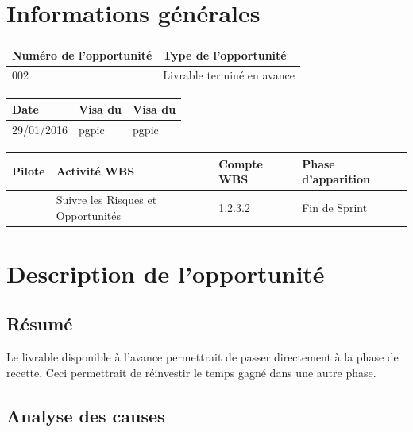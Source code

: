 \section*{Informations générales}
 
\begin{table}[H]
\centering
	\begin{tabularx}{16.8cm}{|X|X|}
	\hline
	\rowcolor{gray!40} Numéro de l'opportunité & Type de l'opportunité \\
	\hline
	 002 & Livrable terminé en avance  \\
	\hline
	\end{tabularx}
\end{table}

\begin{table}[H]
\centering
	\begin{tabularx}{16.8cm}{|X|X|X|}
	\hline
	\rowcolor{gray!40} Date & Visa du \RQ & Visa du \CP \\
	\hline
	 29/01/2016 & pgpic & pgpic \\
	\hline
	\end{tabularx}
\end{table}

\begin{table}[H]
\centering
	\begin{tabularx}{16.8cm}{|X|X|X|X|}
	\hline
	\rowcolor{gray!40} Pilote & Activité WBS & Compte WBS & Phase d'apparition \\
	\hline
	 \Kafui & Suivre les Risques et Opportunités & 1.2.3.2 & Fin de Sprint \\
	\hline
	\end{tabularx}
\end{table}

\section*{Description de l'opportunité}

\subsection*{Résumé}
	Le livrable disponible à l'avance permettrait de passer directement à la phase de recette. Ceci permettrait de réinvestir le temps gagné dans une autre phase.
	
\subsection*{Analyse des causes}
	
